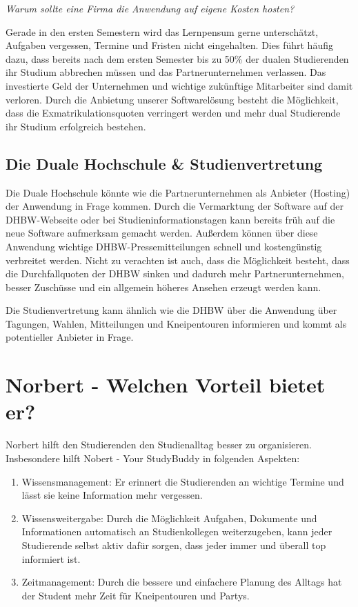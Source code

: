 \textit{Warum sollte eine Firma die Anwendung auf eigene Kosten hosten?}

Gerade in den ersten Semestern wird das Lernpensum gerne unterschätzt, Aufgaben vergessen, Termine und Fristen nicht eingehalten. Dies führt häufig dazu, dass bereits nach dem ersten Semester bis zu 50\% der dualen Studierenden ihr Studium abbrechen müssen und das Partnerunternehmen verlassen. Das investierte Geld der Unternehmen und wichtige zukünftige Mitarbeiter sind damit verloren. Durch die Anbietung unserer Softwarelösung besteht die Möglichkeit, dass die Exmatrikulationsquoten verringert werden und mehr dual Studierende ihr Studium erfolgreich bestehen.

\subsection{Die Duale Hochschule \& Studienvertretung}
Die Duale Hochschule könnte wie die Partnerunternehmen als Anbieter (Hosting) der Anwendung in Frage kommen. Durch die Vermarktung der Software auf der DHBW-Webseite oder bei Studieninformationstagen kann bereits früh auf die neue Software aufmerksam gemacht werden. Außerdem können über diese Anwendung wichtige DHBW-Pressemitteilungen schnell und kostengünstig verbreitet werden. Nicht zu verachten ist auch, dass die Möglichkeit besteht, dass die Durchfallquoten der DHBW sinken und dadurch mehr Partnerunternehmen, besser Zuschüsse und ein allgemein höheres Ansehen erzeugt werden kann.

Die Studienvertretung kann ähnlich wie die DHBW über die Anwendung über Tagungen, Wahlen, Mitteilungen und Kneipentouren informieren und kommt als potentieller Anbieter in Frage.

\section{Norbert - Welchen Vorteil bietet er?}
Norbert hilft den Studierenden den Studienalltag besser zu organisieren. Insbesondere hilft Nobert - Your StudyBuddy in folgenden Aspekten:
\begin{enumerate}
	\item Wissensmanagement: Er erinnert die Studierenden an wichtige Termine und lässt sie keine Information mehr vergessen.
	\item Wissensweitergabe: Durch die Möglichkeit Aufgaben, Dokumente und Informationen automatisch an Studienkollegen weiterzugeben, kann jeder Studierende selbst aktiv dafür sorgen, dass jeder immer und überall top informiert ist.
	\item Zeitmanagement: Durch die bessere und einfachere Planung des Alltags hat der Student mehr Zeit für Kneipentouren und Partys.	
\end{enumerate}

